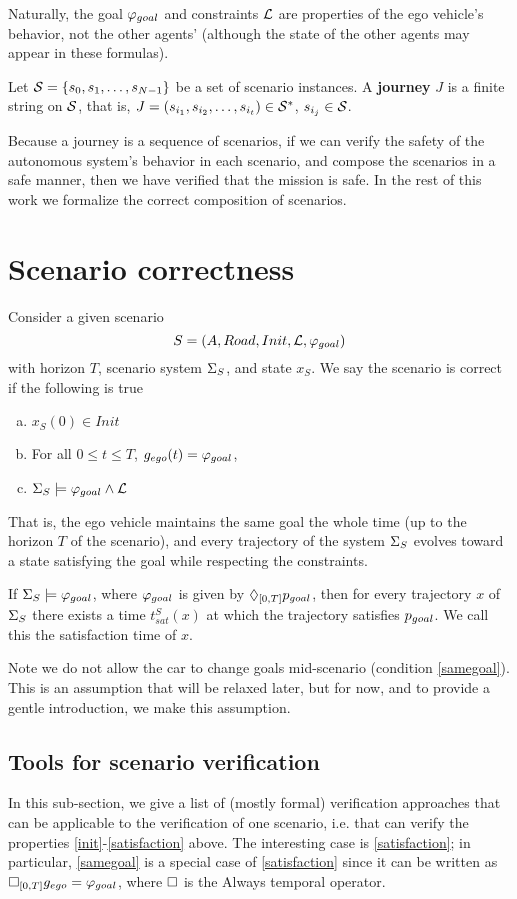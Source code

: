 Naturally, the goal $\varphi_{goal}$ and constraints $\mathcal{L}$ are properties of the ego vehicle's behavior, not the other agents' (although the state of the other agents may appear in these formulas).

\begin{defn}[Journey]
Let $\mathcal{S} = \{s_0,s_1,\ldots,s_{N-1}\}$ be a set of scenario instances. 
A \textbf{journey} $J$ is a finite string on $\mathcal{S}$, that is, $J =  (s_{i_1},s_{i_2},\ldots,s_{i_t} )\in \mathcal{S}^*$, $s_{i_j} \in \mathcal{S}$.
\end{defn}

Because a journey is a sequence of scenarios, if we can verify the safety of the autonomous system's behavior in each scenario,
and compose the scenarios in a safe manner, 
then we have verified that the mission is safe.
In the rest of this work we formalize the correct composition of scenarios.

\section{Scenario correctness}
\label{sec:scenario correctness}
Consider a given scenario 
\[S = (A,Road, Init, \mathcal{L}, \varphi_{goal})\]
with horizon $T$, scenario system $\Sigma_S$, and state $x_S$.
We say the scenario is correct if the following is true
\begin{enumerate}[a.]
	\item $x_S(0) \in Init$
	\label{init}
	\item For all $0 \leq t \leq T$, $g_{ego}(t) = \varphi_{goal}$,
	\label{samegoal}
	\item $\Sigma_S \models \varphi_{goal} \wedge \mathcal{L}$
	\label{satisfaction}
\end{enumerate}
That is, the ego vehicle maintains the same goal the whole time (up to the horizon $T$ of the scenario), 
and every trajectory of the system $\Sigma_S$ evolves toward a state satisfying the goal while respecting the constraints.

If $\Sigma_S \models \varphi_{goal}$, where $\varphi_{goal}$ is given by $\Diamond_{[0,T]} p_{goal}$, then for every trajectory $x$ of $\Sigma_S$ there exists a time $t_{sat}^S(x)$ at which the trajectory satisfies $p_{goal}$.
We call this the satisfaction time of $x$.

Note we do not allow the car to change goals mid-scenario (condition \ref{samegoal}). 
This is an assumption that will be relaxed later, but for now, and to provide a gentle introduction, we make this assumption.

\subsection{Tools for scenario verification}
In this sub-section, we give a list of (mostly formal) verification approaches that can be applicable to the verification of one scenario, i.e. that can verify the properties \ref{init}-\ref{satisfaction} above.
The interesting case is \ref{satisfaction}; in particular, \ref{samegoal} is a special case of \ref{satisfaction} since it can be written as $\square_{[0,T]} g_{ego} = \varphi_{goal}$, 
where $\square$ is the Always temporal operator.


